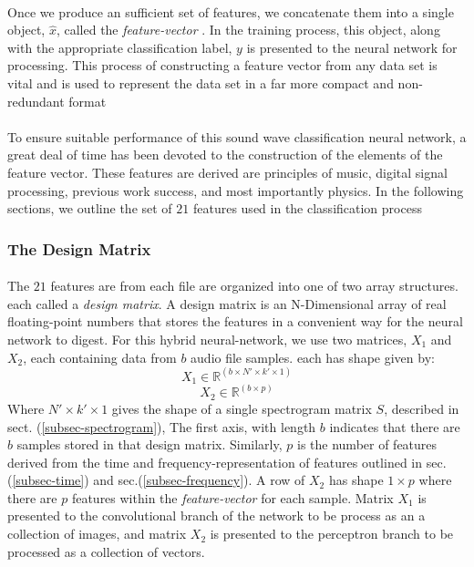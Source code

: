 \documentclass[12pt,letterpaper]{article}
\begin{document}
\paragraph*{}Once we produce an sufficient set of features, we concatenate them into a single object, $\hat{x}$, called the \textit{feature-vector} \cite{Goodfellow}. In the training process, this object, along with the appropriate classification label, $y$ is presented to the neural network for processing. This process of constructing a feature vector from any data set is vital and is used to represent the data set in a far more compact and non-redundant format \cite{Virtanen,Liu}

\paragraph*{}To ensure suitable performance of this sound wave classification neural network, a great deal of time has been devoted to the construction of the elements of the feature vector. These features are derived are principles of music, digital signal processing, previous work success, and most importantly physics. In the following sections, we outline the set of $21$ features used in the classification process

\newpage


\subsubsection{The Design Matrix}

\paragraph*{}The $21$ features are from each file are organized into one of two array structures. each called a \textit{design matrix}. A design matrix is an N-Dimensional array of real floating-point numbers that stores the features in a convenient way for the neural network to digest. For this hybrid neural-network, we use two matrices, $X_1$ and $X_2$, each containing data from $b$ audio file samples. each has shape given by:
\begin{equation}
\label{eqn-X1Shape}
X_1 \in \mathbb{R}^{(b \times N' \times k' \times 1)}
\end{equation}
\begin{equation}
\label{eqn-X2Shape}
X_2 \in \mathbb{R}^{(b \times p)}
\end{equation}
Where $N' \times k' \times 1$ gives the shape of a single spectrogram matrix $S$, described in sect. (\ref{subsec-spectrogram}), The first axis, with length $b$ indicates that there are $b$ samples stored in that design matrix.
Similarly, $p$ is the number of features derived from the time and frequency-representation of features outlined in sec. (\ref{subsec-time}) and sec.(\ref{subsec-frequency}). A row of $X_2$ has shape $1 \times p$ where there are $p$ features within the \textit{feature-vector} for each sample. Matrix $X_1$ is presented to the convolutional branch of the network to be process as an a collection of images, and matrix $X_2$ is presented to the perceptron branch to be processed as a collection of vectors. 
\end{document}
